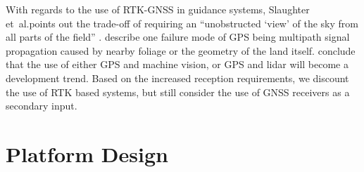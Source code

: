 \documentclass[preprint,authoryear,12pt]{elsarticle}
\begin{document}

        With regards to the use of RTK-GNSS in guidance systems, Slaughter et~al.\@ points out the trade-off of requiring an ``unobstructed `view' of the sky from all parts of the field'' \citep{Slaughter2008}.
        \cite{Durrant-Whyte2005} describe one failure mode of GPS being multipath signal propagation caused by nearby foliage or the geometry of the land itself.
        \cite{Li2009} conclude that the use of either GPS and machine vision, or GPS and lidar will become a development trend.
        Based on the increased reception requirements, we discount the use of RTK based systems, but still consider the use of GNSS receivers as a secondary input.

\section{Platform Design}
\label{sect:design}
\end{document}
